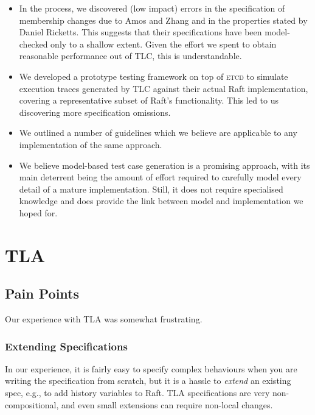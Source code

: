 \documentclass[a4paper]{article}
\makeatletter
\newcommand{\tname}[1]{\textsc{#1}\xspace}
\newcommand{\etcd}{\tname{etcd}}
\newcommand*{\eg}{e.g.\@\xspace}
\makeatother
\begin{document}
\begin{itemize}
    \item In the process, we discovered (low impact) errors in the
    specification of membership changes due to Amos and Zhang and in the
    properties stated by Daniel Ricketts.
    This suggests that their specifications have been model-checked only to a shallow extent.
    Given the effort we spent to obtain reasonable performance out of TLC, this is understandable.

    \item We developed a prototype testing framework on top of \etcd to simulate execution traces generated by TLC against their actual Raft implementation, covering a representative subset of Raft's functionality.
    This led to us discovering more specification omissions.

    \item We outlined a number of guidelines which we believe are applicable to any implementation of the same approach.

    \item We believe model-based test case generation is a promising approach, with its main deterrent being the amount of effort required to carefully model every detail of a mature implementation. Still, it does not require specialised knowledge and does provide the link between model and implementation we hoped for.

\end{itemize}

\section{TLA}

\subsection{Pain Points}

Our experience with TLA was somewhat frustrating.

\subsubsection{Extending Specifications}

In our experience, it is fairly easy to specify complex behaviours when you are writing the specification from scratch, but it is a hassle to \emph{extend} an existing spec, \eg, to add history variables to Raft. 
%
TLA specifications are very non-compositional, and even small extensions can require non-local changes.
\end{document}
